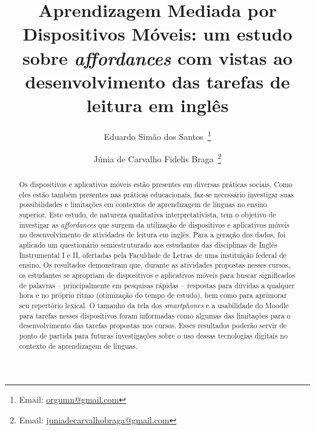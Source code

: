 \documentclass[portuguese]{textolivre}
\title{Aprendizagem Mediada por Dispositivos Móveis: um estudo sobre \emph{affordances} com vistas ao desenvolvimento das tarefas de leitura em inglês}
\author[1]{Eduardo Simão dos Santos~\orcid{0000-0003-4061-8780}\thanks{Email: \href{mailto:orgumn@gmail.com}{orgumn@gmail.com}}}
\author[1]{Júnia de Carvalho Fidelis Braga~\orcid{0000-0002-8450-2061}\thanks{Email: \href{mailto:juniadecarvalhobraga@gmail.com}{juniadecarvalhobraga@gmail.com}}}
\affil[2]{Universidade Federal de Minas Gerais, Faculdade de Letras, Belo Horizonte, MG, Brasil.}
\begin{document}
\maketitle

\begin{polyabstract}
\begin{abstract}
 Os dispositivos e aplicativos móveis estão presentes em diversas práticas sociais. Como eles estão também presentes nas práticas educacionais, faz-se necessário investigar suas possibilidades e limitações em contextos de aprendizagem de línguas no ensino superior. Este estudo, de natureza qualitativa  interpretativista, tem o objetivo de investigar as \emph{affordances} que surgem da utilização de dispositivos e aplicativos móveis no desenvolvimento de atividades de leitura em inglês. Para a geração dos dados, foi aplicado um questionário semiestruturado aos estudantes das disciplinas de Inglês Instrumental I e II, ofertadas pela Faculdade de Letras de uma instituição federal de ensino. Os resultados demonstram que, durante as atividades propostas nesses cursos, os estudantes se apropriam de dispositivos e aplicativos móveis para buscar significados de palavras – principalmente em pesquisas rápidas – respostas para dúvidas a qualquer hora e no próprio ritmo (otimização do tempo de estudo), bem como para aprimorar seu repertório lexical. O tamanho da tela dos \emph{smartphones} e a usabilidade do Moodle para tarefas nesses dispositivos foram informadas como algumas das limitações para o desenvolvimento das tarefas propostas nos cursos. Esses resultados poderão servir de ponto de partida para futuras investigações sobre o uso dessas tecnologias digitais no contexto de aprendizagem de línguas.

\end{abstract}


\end{polyabstract}
\end{document}
